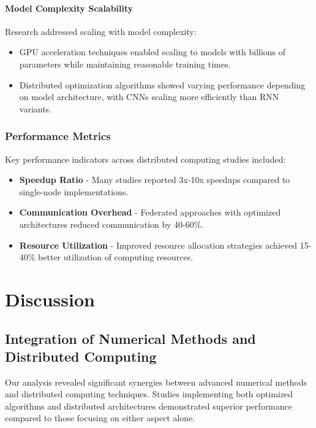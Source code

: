 \paragraph{Model Complexity Scalability}
Research addressed scaling with model complexity:
\begin{itemize}
    \item GPU acceleration techniques enabled scaling to models with billions of parameters while maintaining reasonable training times.
    
    \item Distributed optimization algorithms showed varying performance depending on model architecture, with CNNs scaling more efficiently than RNN variants.
\end{itemize}

\subsubsection{Performance Metrics}
Key performance indicators across distributed computing studies included:
\begin{itemize}
    \item \textbf{Speedup Ratio} - Many studies reported 3x-10x speedups compared to single-node implementations.
    
    \item \textbf{Communication Overhead} - Federated approaches with optimized architectures reduced communication by 40-60\%.
    
    \item \textbf{Resource Utilization} - Improved resource allocation strategies achieved 15-40\% better utilization of computing resources.
\end{itemize}

\section{Discussion}

\subsection{Integration of Numerical Methods and Distributed Computing}
Our analysis revealed significant synergies between advanced numerical methods and distributed computing techniques. Studies implementing both optimized algorithms and distributed architectures demonstrated superior performance compared to those focusing on either aspect alone.

